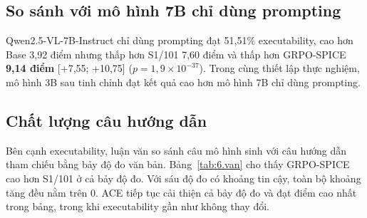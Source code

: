 \subsection{So sánh với mô hình 7B chỉ dùng prompting}\label{sec:6.7b}

Qwen2.5-VL-7B-Instruct chỉ dùng prompting đạt 51,51\% executability, cao hơn Base 3,92 điểm nhưng thấp hơn S1/101 7,60 điểm và thấp hơn GRPO-SPICE \textbf{9,14 điểm} [+7,55; +10,75] ($p = 1{,}9 \times 10^{-37}$). Trong cùng thiết lập thực nghiệm, mô hình 3B sau tinh chỉnh đạt kết quả cao hơn mô hình 7B chỉ dùng prompting.

\subsection{Chất lượng câu hướng dẫn}\label{sec:6.vanban}

Bên cạnh executability, luận văn so sánh câu mô hình sinh với câu hướng dẫn tham chiếu bằng bảy độ đo văn bản. Bảng~\ref{tab:6.van} cho thấy GRPO-SPICE cao hơn S1/101 ở cả bảy độ đo. Với sáu độ đo có khoảng tin cậy, toàn bộ khoảng tăng đều nằm trên 0. ACE tiếp tục cải thiện cả bảy độ đo và đạt điểm cao nhất trong bảng, trong khi executability gần như không thay đổi.

